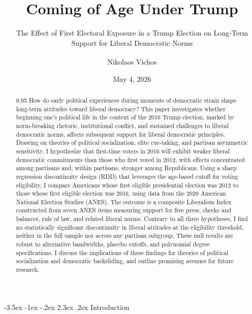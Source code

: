 \documentclass[
  10pt,
  letterpaper,
  DIV=11,
  numbers=noendperiod]{scrartcl}
\title{Coming of Age Under Trump}
\subtitle{The Effect of First Electoral Exposure in a Trump Election on
Long-Term Support for Liberal Democratic Norms}
\author{Nikolaos Vichos\textsuperscript{}}
\date{May 4, 2026}
\makeatletter
\renewcommand\section{\@startsection{section}{1}{\z@}%
  {-3.5ex \@plus -1ex \@minus -.2ex}%
  {2.3ex \@plus.2ex}%
  {\normalfont\Large\bfseries\centering}}
\makeatother
\begin{document}
\maketitle
\begin{abstract}
\begin{spacing}{0.95}
How do early political experiences during moments of democratic strain shape long-term attitudes toward liberal democracy? This paper investigates whether beginning one's political life in the context of the 2016 Trump election, marked by norm-breaking rhetoric, institutional conflict, and sustained challenges to liberal democratic norms, affects subsequent support for liberal democratic principles. Drawing on theories of political socialization, elite cue-taking, and partisan asymmetric sensitivity, I hypothesize that first-time voters in 2016 will exhibit weaker liberal democratic commitments than those who first voted in 2012, with effects concentrated among partisans and, within partisans, stronger among Republicans. Using a sharp regression discontinuity design (RDD) that leverages the age-based cutoff for voting eligibility, I compare Americans whose first eligible presidential election was 2012 to those whose first eligible election was 2016, using data from the 2020 American National Election Studies (ANES). The outcome is a composite Liberalism Index constructed from seven ANES items measuring support for free press, checks and balances, rule of law, and related liberal norms. Contrary to all three hypotheses, I find no statistically significant discontinuity in liberal attitudes at the eligibility threshold, neither in the full sample nor across any partisan subgroup. These null results are robust to alternative bandwidths, placebo cutoffs, and polynomial degree specifications. I discuss the implications of these findings for theories of political socialization and democratic backsliding, and outline promising avenues for future research.
\end{spacing}
\end{abstract}



\newpage{}

\thispagestyle{empty}

\tableofcontents

\newpage{}


\setcounter{page}{1}

\section{Introduction}\label{introduction}
\end{document}
